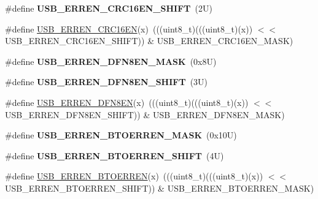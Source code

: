 \begin{DoxyCompactItemize}
\item 
\mbox{\label{group___u_s_b___register___masks_ga7d910c7016807387969de45f0ac3e2d6}} 
\#define {\bfseries U\+S\+B\+\_\+\+E\+R\+R\+E\+N\+\_\+\+C\+R\+C16\+E\+N\+\_\+\+S\+H\+I\+FT}~(2\+U)
\item 
\#define \mbox{\hyperlink{group___u_s_b___register___masks_gab790bf2a5fa9f59ed6d50f0e1ea812f3}{U\+S\+B\+\_\+\+E\+R\+R\+E\+N\+\_\+\+C\+R\+C16\+EN}}(x)~(((uint8\+\_\+t)(((uint8\+\_\+t)(x)) $<$$<$ U\+S\+B\+\_\+\+E\+R\+R\+E\+N\+\_\+\+C\+R\+C16\+E\+N\+\_\+\+S\+H\+I\+FT)) \& U\+S\+B\+\_\+\+E\+R\+R\+E\+N\+\_\+\+C\+R\+C16\+E\+N\+\_\+\+M\+A\+SK)
\item 
\mbox{\label{group___u_s_b___register___masks_ga4077d6e25312cdf05ef982907720c2f6}} 
\#define {\bfseries U\+S\+B\+\_\+\+E\+R\+R\+E\+N\+\_\+\+D\+F\+N8\+E\+N\+\_\+\+M\+A\+SK}~(0x8\+U)
\item 
\mbox{\label{group___u_s_b___register___masks_ga25ff64c64f5871c1c278c5639d862ba7}} 
\#define {\bfseries U\+S\+B\+\_\+\+E\+R\+R\+E\+N\+\_\+\+D\+F\+N8\+E\+N\+\_\+\+S\+H\+I\+FT}~(3\+U)
\item 
\#define \mbox{\hyperlink{group___u_s_b___register___masks_ga7b04fb03c3c9e21455addc61a82203e2}{U\+S\+B\+\_\+\+E\+R\+R\+E\+N\+\_\+\+D\+F\+N8\+EN}}(x)~(((uint8\+\_\+t)(((uint8\+\_\+t)(x)) $<$$<$ U\+S\+B\+\_\+\+E\+R\+R\+E\+N\+\_\+\+D\+F\+N8\+E\+N\+\_\+\+S\+H\+I\+FT)) \& U\+S\+B\+\_\+\+E\+R\+R\+E\+N\+\_\+\+D\+F\+N8\+E\+N\+\_\+\+M\+A\+SK)
\item 
\mbox{\label{group___u_s_b___register___masks_ga3e02cf7d8b6fce5077848051a320c609}} 
\#define {\bfseries U\+S\+B\+\_\+\+E\+R\+R\+E\+N\+\_\+\+B\+T\+O\+E\+R\+R\+E\+N\+\_\+\+M\+A\+SK}~(0x10\+U)
\item 
\mbox{\label{group___u_s_b___register___masks_ga6df540868c71ce6e3c7b8737a048c2aa}} 
\#define {\bfseries U\+S\+B\+\_\+\+E\+R\+R\+E\+N\+\_\+\+B\+T\+O\+E\+R\+R\+E\+N\+\_\+\+S\+H\+I\+FT}~(4\+U)
\item 
\#define \mbox{\hyperlink{group___u_s_b___register___masks_gacd448b6d7c5031433ac1d25bfb7a5f0d}{U\+S\+B\+\_\+\+E\+R\+R\+E\+N\+\_\+\+B\+T\+O\+E\+R\+R\+EN}}(x)~(((uint8\+\_\+t)(((uint8\+\_\+t)(x)) $<$$<$ U\+S\+B\+\_\+\+E\+R\+R\+E\+N\+\_\+\+B\+T\+O\+E\+R\+R\+E\+N\+\_\+\+S\+H\+I\+FT)) \& U\+S\+B\+\_\+\+E\+R\+R\+E\+N\+\_\+\+B\+T\+O\+E\+R\+R\+E\+N\+\_\+\+M\+A\+SK)
$$
\end{DoxyCompactItemize}
